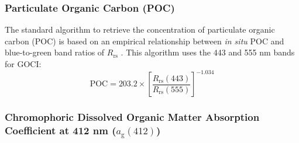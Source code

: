 \documentclass[remotesensing,article,submit,moreauthors,pdftex,10pt,a4paper]{Definitions/mdpi}
\begin{document}
\subsubsection{Particulate Organic Carbon (POC)}
The standard algorithm to retrieve the concentration of particulate organic carbon (POC) is based on an empirical relationship between {\it in situ} POC and blue-to-green band ratios of $R_\text{rs}$ \cite{Stramski2008}. This algorithm uses the 443 and 555 nm bands for GOCI:
\begin{equation}
  \text{POC} = 203.2\times \left[\frac{R_\text{rs}(443)}{R_\text{rs}(555)} \right]^{-1.034}
\end{equation}


    


\subsubsection{Chromophoric Dissolved Organic Matter Absorption Coefficient at 412 nm ($a_\text{g}(412)$)}
\end{document}
